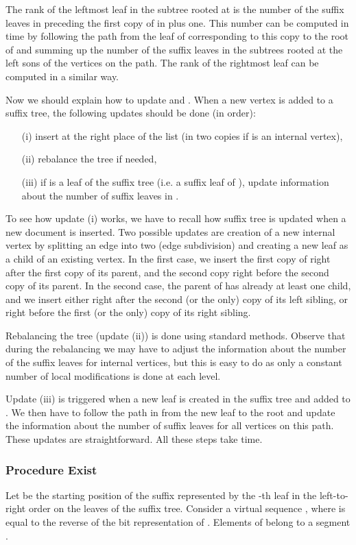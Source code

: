 \documentclass[10pt]{llncs}
\newcommand{\exist}{{\sc Exist}}
\begin{document}
The rank of the leftmost leaf in the subtree rooted at  is the number of the suffix leaves in  preceding the first copy of  in  plus one. This number can be computed in  time by following the path from the leaf of  corresponding to this copy to the root of  and summing up the number of the suffix leaves in the subtrees rooted at the left sons of the vertices on the path. The rank of the rightmost leaf can be computed in a similar way.

Now we should explain how to update  and . When a new vertex  is added to a suffix tree, the following updates should be done (in order):

\begin{itemize}
\item[(i)] insert  at the right place of the list  (in two copies if  is an internal vertex),
\item[(ii)] rebalance the tree  if needed,
\item[(iii)] if  is a leaf of the suffix tree (i.e. a suffix leaf of ), update information about the number of suffix leaves in .
\end{itemize}

To see how update (i) works, we have to recall how suffix tree is updated when a new document is inserted. Two possible updates are creation of a new internal vertex  by splitting an edge into two (edge subdivision) and creating a new leaf  as a child of an existing vertex. In the first case, we insert the first copy of  right after the first copy of its parent, and the second copy right before the second copy of its parent. In the second case, the parent of  has already at least one child, and we insert  either right after the second (or the only) copy of its left sibling, or right before the first (or the only) copy of its right sibling. 

Rebalancing the tree  (update (ii)) is done using standard methods. Observe that during the rebalancing we may have to adjust the information about the number of the suffix leaves for internal vertices, but this is easy to do as only a constant number of local modifications is done at each level.

Update (iii) is triggered when a new leaf  is created in the suffix tree and added to . We then have to follow the path in  from the new leaf  to the root and update the information about the number of suffix leaves for all vertices on this path. These updates are
straightforward. All these steps take  time. 

\subsubsection{Procedure \exist}
Let  be the starting position of the suffix represented by the -th leaf in the left-to-right order on the leaves of the suffix tree. Consider a virtual sequence , where  is equal to the reverse of the bit representation of . Elements of  belong to a segment .
\end{document}
